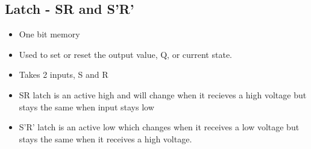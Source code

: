 \documentclass{article}
\begin{document}
\subsection{Latch - SR and S'R'}

\begin{itemize}
    \item One bit memory
    
    \item Used to set or reset the output value, Q, or current state. 
    
    \item Takes 2 inputs, S and R
    
    \item SR latch is an active high and will change when it recieves a high voltage but stays the same when input stays low
    
    \item S'R' latch is an active low which changes when it receives a low voltage but stays the same when it receives a high voltage.
\end{itemize}
\end{document}
